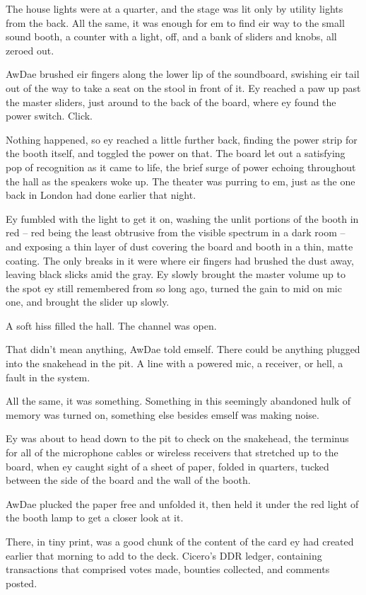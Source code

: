 The house lights were at a quarter, and the stage was lit only by utility lights from the back.  All the same, it was enough for em to find eir way to the small sound booth, a counter with a light, off, and a bank of sliders and knobs, all zeroed out.

AwDae brushed eir fingers along the lower lip of the soundboard, swishing eir tail out of the way to take a seat on the stool in front of it.  Ey reached a paw up past the master sliders, just around to the back of the board, where ey found the power switch.  Click.

Nothing happened, so ey reached a little further back, finding the power strip for the booth itself, and toggled the power on that.  The board let out a satisfying pop of recognition as it came to life, the brief surge of power echoing throughout the hall as the speakers woke up.  The theater was purring to em, just as the one back in London had done earlier that night.

Ey fumbled with the light to get it on, washing the unlit portions of the booth in red -- red being the least obtrusive from the visible spectrum in a dark room -- and exposing a thin layer of dust covering the board and booth in a thin, matte coating.  The only breaks in it were where eir fingers had brushed the dust away, leaving black slicks amid the gray.  Ey slowly brought the master volume up to the spot ey still remembered from so long ago, turned the gain to mid on mic one, and brought the slider up slowly.

A soft hiss filled the hall.  The channel was open.

That didn't mean anything, AwDae told emself.  There could be anything plugged into the snakehead in the pit.  A line with a powered mic, a receiver, or hell, a fault in the system.

All the same, it was something.  Something in this seemingly abandoned hulk of memory was turned on, something else besides emself was making noise.

Ey was about to head down to the pit to check on the snakehead, the terminus for all of the microphone cables or wireless receivers that stretched up to the board, when ey caught sight of a sheet of paper, folded in quarters, tucked between the side of the board and the wall of the booth.

AwDae plucked the paper free and unfolded it, then held it under the red light of the booth lamp to get a closer look at it.

There, in tiny print, was a good chunk of the content of the card ey had created earlier that morning to add to the deck.  Cicero's DDR ledger, containing transactions that comprised votes made, bounties collected, and comments posted.

